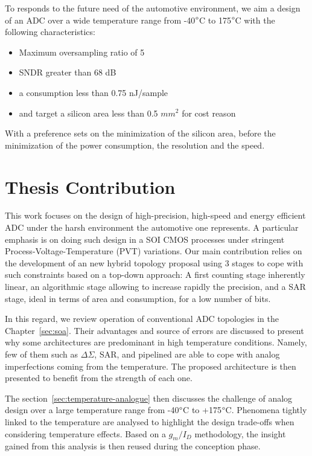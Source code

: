 To responds to the future need of the automotive environment, we aim a design of an ADC over a wide temperature range from -40\(\degree \)C to 175\(\degree \)C with the following characteristics:

\begin{itemize}
\item Maximum oversampling ratio of 5
\item SNDR greater than 68 dB
\item a consumption less than 0.75 nJ/sample
\item and target a silicon area less than 0.5 \(mm^2 \) for cost reason
\end{itemize}
 
With a preference sets on the minimization of the silicon area, before the minimization of the power consumption, the resolution and the speed.

\section{Thesis Contribution}

This work focuses on the design of high-precision, high-speed and energy efficient ADC under the harsh environment the automotive one represents. A particular emphasis is on doing such design in a SOI CMOS processes under stringent Process-Voltage-Temperature (PVT) variations. Our main contribution relies on the development of an new hybrid topology proposal using 3 stages to cope with such constraints based on a top-down approach: A first counting stage inherently linear, an algorithmic stage allowing to increase rapidly the precision, and a SAR stage, ideal in terms of area and consumption, for a low number of bits.

In this regard, we review operation of conventional ADC topologies in the Chapter~\ref{sec:soa}. Their advantages and source of errors are discussed to present why some architectures are predominant in high temperature conditions. Namely, few of them such as \(\Delta \Sigma\), SAR, and pipelined are able to cope with analog imperfections coming from the temperature. The proposed architecture is then presented to benefit from the strength of each one.

The section~\ref{sec:temperature-analogue} then discusses the challenge of analog design over a large temperature range from -40\(\degree\)C to +175\(\degree\)C. Phenomena tightly linked to the temperature are analysed to highlight the design trade-offs when considering temperature effects. Based on a \(g_m/I_D\) methodology, the insight gained from this analysis is then reused during the conception phase.


